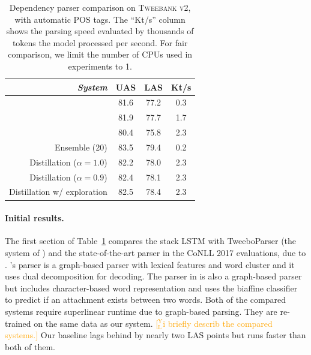 \documentclass[11pt,a4paper]{article}
\newcommand{\yjcomment}[1]{\textcolor{orange}{[$_\mathrm{L}^\mathrm{Y}$#1]}}
\begin{document}
\begin{table}[t]
	\centering
	\begin{tabular}{rccc}
		\hline
		\it System & UAS & LAS & Kt/s \\
		\hline
		\citet{kong-EtAl:2014:EMNLP2014} &81.6 & 77.2 & 0.3 \\
		\citet{dozat-qi-manning:2017:K17-3} & 81.9 &  77.7 & 1.7 \\
		\newcite{ballesteros-EtAl:2016:EMNLP2016} & 80.4 & 75.8 & 2.3 \\
		\hdashline
		Ensemble (20) & 83.5 & 79.4 & 0.2 \\
		Distillation ($\alpha =1.0$) & 82.2 & 78.0 & 2.3 \\
		Distillation ($\alpha =0.9$) & 82.4 & 78.1 & 2.3 \\		
		Distillation w/ exploration & 82.5 & 78.4 & 2.3 \\
		\hline
	\end{tabular}
	\caption{Dependency parser comparison on \textsc{Tweebank v2},
           with automatic POS tags. The ``Kt/s'' column shows
           the parsing speed evaluated by thousands of tokens
           the model processed per second. For fair comparison, we limit the
           number of CPUs used in \citet{dozat-qi-manning:2017:K17-3} experiments to 1.
            \label{tbl:parse-result}}
\end{table}

\paragraph{Initial results.}  The first section of Table~\ref{tbl:parse-result} compares
the stack LSTM with {\sc TweeboParser} (the system 
of \citealp{kong-EtAl:2014:EMNLP2014}) and the state-of-the-art parser
in the CoNLL 2017 evaluations, due to
 \citet{dozat-qi-manning:2017:K17-3}.
 \citet{kong-EtAl:2014:EMNLP2014}'s parser is a graph-based
parser with lexical features and word cluster and it uses dual decomposition
for decoding. The parser in \citet{dozat-qi-manning:2017:K17-3} is also a graph-based parser
but includes character-based word representation and uses the biaffine classifier
to predict if an attachment exists between two words.
Both of the compared systems require superlinear runtime due to graph-based parsing. 
They are re-trained on the same data as our
system. \yjcomment{i briefly describ the compared systems.}
Our baseline lags behind by nearly two LAS
points but runs faster than both of them.
\end{document}
